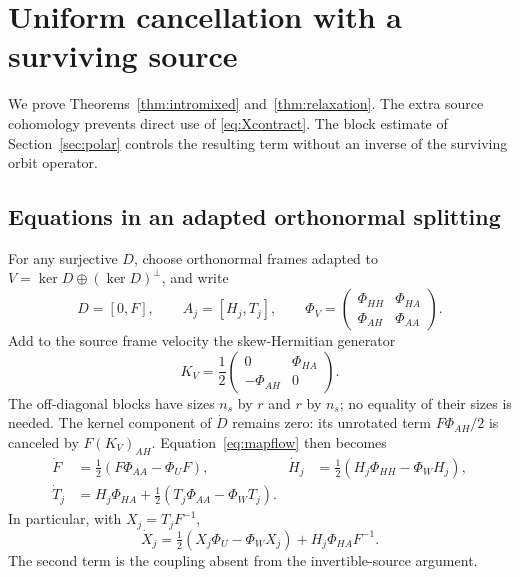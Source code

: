 \section{Uniform cancellation with a surviving source}\label{sec:mixed}

We prove Theorems~\ref{thm:intromixed} and~\ref{thm:relaxation}. The extra source cohomology
prevents direct use of \eqref{eq:Xcontract}. The block estimate of
Section~\ref{sec:polar} controls the resulting term without an inverse
of the surviving orbit operator.

\subsection{Equations in an adapted orthonormal splitting}
For any surjective $D$, choose orthonormal frames adapted to
$V=\ker D\oplus(\ker D)^\perp$, and write
\[
 D=[0,F],\qquad A_j=[H_j,T_j],\qquad
 \Phi_V=\begin{pmatrix}\Phi_{HH}&\Phi_{HA}\\
                         \Phi_{AH}&\Phi_{AA}\end{pmatrix}.
\]
Add to the source frame velocity the skew-Hermitian generator
\[
 K_V=\frac12\begin{pmatrix}0&\Phi_{HA}\\-\Phi_{AH}&0\end{pmatrix}.
\]
The off-diagonal blocks have sizes $n_s$ by $r$ and $r$ by $n_s$;
no equality of their sizes is needed. The kernel component of $\dot D$
remains zero: its unrotated term
$F\Phi_{AH}/2$ is canceled by $F(K_V)_{AH}$.
Equation~\eqref{eq:mapflow} then becomes
\begin{align}
 \dot F&=\tfrac12(F\Phi_{AA}-\Phi_UF),&
 \dot H_j&=\tfrac12(H_j\Phi_{HH}-\Phi_WH_j),\label{eq:adapted1}\\
 \dot T_j&=H_j\Phi_{HA}
              +\tfrac12(T_j\Phi_{AA}-\Phi_WT_j).\label{eq:adapted2}
\end{align}
In particular, with $X_j=T_jF^{-1}$,
\begin{equation}\label{eq:mixedX}
 \dot X_j=\tfrac12(X_j\Phi_U-\Phi_WX_j)+H_j\Phi_{HA}F^{-1}.
\end{equation}
The second term is the coupling absent from the invertible-source
argument.


